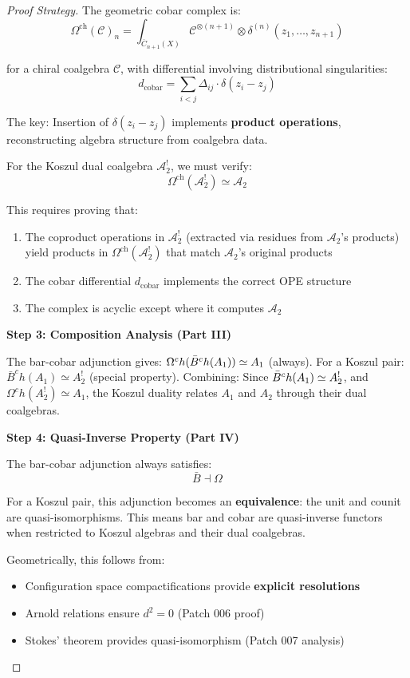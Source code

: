 \begin{proof}[Proof Strategy]
The geometric cobar complex is:
$$\Omega^{\text{ch}}(\mathcal{C})_n = \int_{\overline{C}_{n+1}(X)} \mathcal{C}^{\otimes (n+1)} 
   \otimes \delta^{(n)}(z_1, \ldots, z_{n+1})$$

for a chiral coalgebra $\mathcal{C}$, with differential involving distributional singularities:
$$d_{\text{cobar}} = \sum_{i < j} \Delta_{ij} \cdot \delta(z_i - z_j)$$

The key: Insertion of $\delta(z_i - z_j)$ implements \textbf{product operations}, 
reconstructing algebra structure from coalgebra data.

For the Koszul dual coalgebra $\mathcal{A}_2^!$, we must verify:
$$\Omega^{\text{ch}}(\mathcal{A}_2^!) \simeq \mathcal{A}_2$$

This requires proving that:
\begin{enumerate}
\item The coproduct operations in $\mathcal{A}_2^!$ (extracted via residues from $\mathcal{A}_2$'s 
      products) yield products in $\Omega^{\text{ch}}(\mathcal{A}_2^!)$ that match $\mathcal{A}_2$'s 
      original products
\item The cobar differential $d_{\text{cobar}}$ implements the correct OPE structure
\item The complex is acyclic except where it computes $\mathcal{A}_2$
\end{enumerate}

\textbf{Step 3: Composition Analysis (Part III)}

The bar-cobar adjunction gives: $\Omega^ch(\Bar{B}^ch(A_1)) \simeq A_1$ (always).
For a Koszul pair: $\bar{B}^ch(A_1) \simeq A_2^!$ (special property).
Combining: Since $\Bar{B}^ch(A_1) \simeq A_2^!$, and $\Omega^ch(A_2^!) \simeq A_1$, 
the Koszul duality relates $A_1$ and $A_2$ through their dual coalgebras.

\textbf{Step 4: Quasi-Inverse Property (Part IV)}

The bar-cobar adjunction always satisfies:
$$\bar{B} \dashv \Omega$$

For a Koszul pair, this adjunction becomes an \textbf{equivalence}: the unit and counit 
are quasi-isomorphisms. This means bar and cobar are quasi-inverse functors when restricted 
to Koszul algebras and their dual coalgebras.

Geometrically, this follows from:
\begin{itemize}
\item Configuration space compactifications provide \textbf{explicit resolutions}
\item Arnold relations ensure $d^2 = 0$ (Patch 006 proof)
\item Stokes' theorem provides quasi-isomorphism (Patch 007 analysis)
\end{itemize}
\end{proof}


